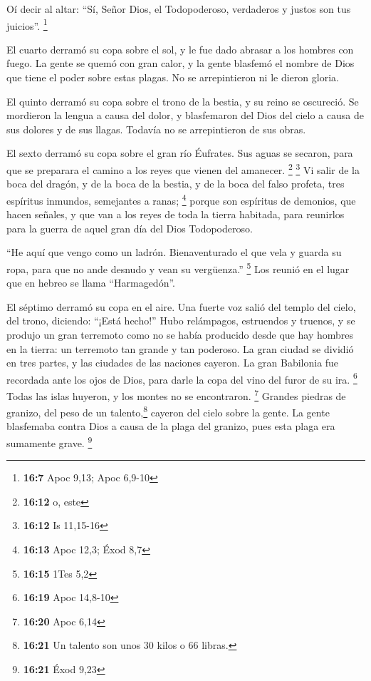  Oí decir al altar: ``Sí, Señor Dios, el Todopoderoso,
verdaderos y justos son tus juicios''. \footnote{\textbf{16:7} Apoc
  9,13; Apoc 6,9-10}

 El cuarto derramó su copa sobre el sol, y le fue dado
abrasar a los hombres con fuego.  La gente se quemó con
gran calor, y la gente blasfemó el nombre de Dios que tiene el poder
sobre estas plagas. No se arrepintieron ni le dieron gloria.

 El quinto derramó su copa sobre el trono de la bestia, y
su reino se oscureció. Se mordieron la lengua a causa del dolor,
 y blasfemaron del Dios del cielo a causa de sus dolores
y de sus llagas. Todavía no se arrepintieron de sus obras.

 El sexto derramó su copa sobre el gran río Éufrates. Sus
aguas se secaron, para que se preparara el camino a los reyes que vienen
del amanecer. \footnote{\textbf{16:12} o, este} \footnote{\textbf{16:12}
  Is 11,15-16}  Vi salir de la boca del dragón, y de la
boca de la bestia, y de la boca del falso profeta, tres espíritus
inmundos, semejantes a ranas; \footnote{\textbf{16:13} Apoc 12,3; Éxod
  8,7}  porque son espíritus de demonios, que hacen
señales, y que van a los reyes de toda la tierra habitada, para
reunirlos para la guerra de aquel gran día del Dios Todopoderoso.

 ``He aquí que vengo como un ladrón. Bienaventurado el
que vela y guarda su ropa, para que no ande desnudo y vean su
vergüenza.'' \footnote{\textbf{16:15} 1Tes 5,2}  Los
reunió en el lugar que en hebreo se llama ``Harmagedón''.

 El séptimo derramó su copa en el aire. Una fuerte voz
salió del templo del cielo, del trono, diciendo: ``¡Está hecho!''
 Hubo relámpagos, estruendos y truenos, y se produjo un
gran terremoto como no se había producido desde que hay hombres en la
tierra: un terremoto tan grande y tan poderoso.  La gran
ciudad se dividió en tres partes, y las ciudades de las naciones
cayeron. La gran Babilonia fue recordada ante los ojos de Dios, para
darle la copa del vino del furor de su ira. \footnote{\textbf{16:19}
  Apoc 14,8-10}  Todas las islas huyeron, y los montes no
se encontraron. \footnote{\textbf{16:20} Apoc 6,14} 
Grandes piedras de granizo, del peso de un talento,\footnote{\textbf{16:21}
  Un talento son unos 30 kilos o 66 libras.} cayeron del cielo sobre la
gente. La gente blasfemaba contra Dios a causa de la plaga del granizo,
pues esta plaga era sumamente grave. \footnote{\textbf{16:21} Éxod 9,23}

